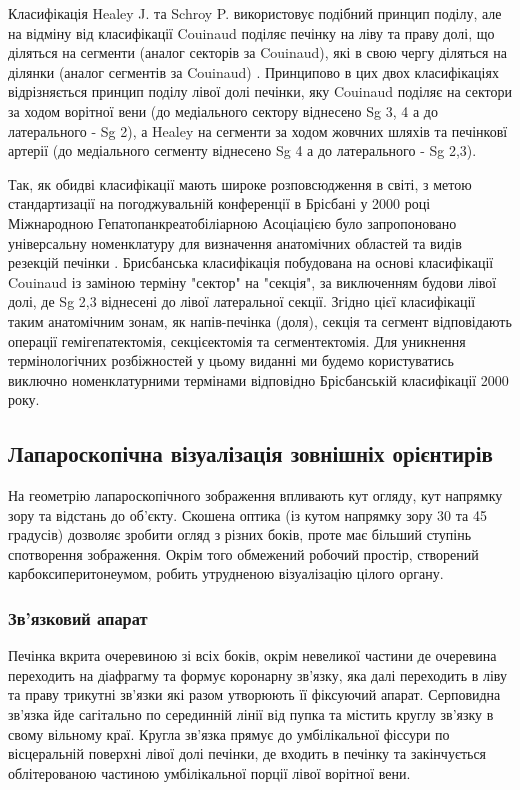 \begin{refsection}
Класифікація Healey J. та Schroy P. використовує подібний принцип поділу, але на відміну від класифікації Couinaud поділяє печінку на ліву та праву долі, що діляться на сегменти (аналог секторів за Couinaud), які в свою чергу діляться на ділянки (аналог сегментів за Couinaud) \cite{HEALEY1953}. Принципово в цих двох класифікаціях відрізняється принцип поділу лівої долі печінки, яку Couinaud поділяє на сектори за ходом ворітної вени (до медіального сектору віднесено Sg 3, 4 а до латерального -  Sg 2), а Healey на сегменти за ходом жовчних шляхів та печінковї артерії (до медіального сегменту віднесено Sg 4 а до латерального - Sg 2,3).  

Так, як обидві класифікації мають широке розповсюдження в світі, з метою стандартизації на погоджувальній конференції в Брісбані у 2000 році Міжнародною Гепатопанкреатобіліарною Асоціацією було запропоновано універсальну номенклатуру для визначення анатомічних областей та видів резекцій печінки \cite{Pang2000}. Брисбанська класифікація побудована на основі класифікації Couinaud із заміною терміну "сектор" на "секція", за виключенням будови лівої долі, де Sg 2,3 віднесені до лівої латеральної секції. Згідно цієї класифікації таким анатомічним зонам, як напів-печінка (доля), секція та сегмент відповідають операції гемігепатектомія, секцієектомія та сегментектомія. Для уникнення термінологічних розбіжностей у цьому виданні ми будемо користуватись виключно номенклатурними термінами відповідно Брісбанській класифікації 2000 року.

\subsection{Лапароскопічна візуалізація зовнішніх орієнтирів}

На геометрію лапароскопічного зображення впливають кут огляду, кут напрямку зору та відстань до об'єкту. Скошена оптика (із кутом напрямку зору 30 та 45 градусів) дозволяє зробити огляд з різних боків, проте має більший ступінь спотворення зображення. Окрім того обмежений робочий простір, створений карбоксиперитонеумом, робить утрудненою візуалізацію цілого органу.

\subsubsection{Зв'язковий апарат}

Печінка вкрита очеревиною зі всіх боків, окрім невеликої частини  де очеревина переходить на діафрагму та формує коронарну зв'язку, яка далі переходить в ліву та праву трикутні зв'язки які разом утворюють її фіксуючий апарат. Серповидна зв'язка йде сагітально по серединній лінії від пупка та містить круглу зв'язку в свому вільному краї. Кругла зв'язка прямує до умбілікальної фіссури по вісцеральній поверхні лівої долі печінки, де входить в печінку та закінчується облітерованою частиною умбілікальної порції лівої ворітної вени. 


\end{refsection}
